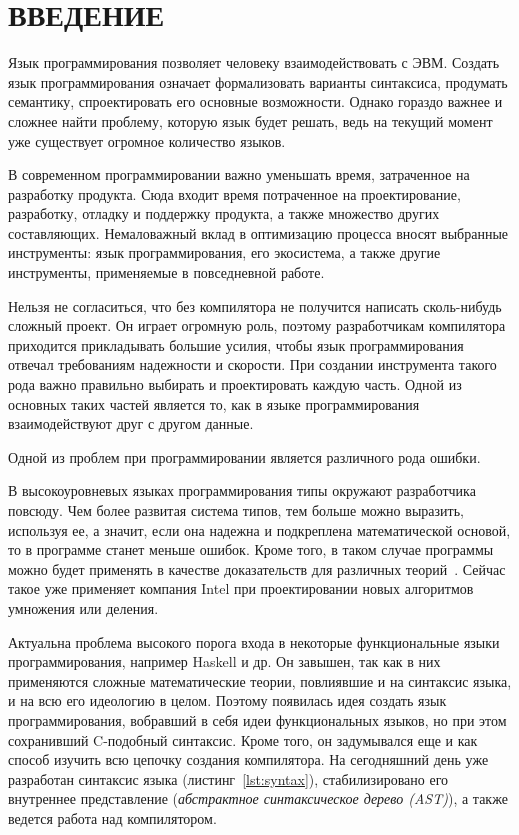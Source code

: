 \chapter*{ВВЕДЕНИЕ}\label{ch:introduction}


Язык программирования позволяет человеку взаимодействовать с ЭВМ.
Создать язык программирования означает формализовать варианты синтаксиса, продумать семантику, спроектировать его основные возможности.
Однако гораздо важнее и сложнее найти проблему, которую язык будет решать, ведь на текущий момент уже существует огромное количество языков.

В современном программировании важно уменьшать время, затраченное на разработку продукта.
Сюда входит время потраченное на проектирование, разработку, отладку и поддержку продукта, а также множество других составляющих.
Немаловажный вклад в оптимизацию процесса вносят выбранные инструменты: язык программирования, его экосистема, а также другие инструменты, применяемые в повседневной работе.

Нельзя не согласиться, что без компилятора не получится написать сколь-нибудь сложный проект.
Он играет огромную роль, поэтому разработчикам компилятора приходится прикладывать большие усилия, чтобы язык программирования отвечал требованиям надежности и скорости.
При создании инструмента такого рода важно правильно выбирать и проектировать каждую часть.
Одной из основных таких частей является то, как в языке программирования взаимодействуют друг с другом данные.

Одной из проблем при программировании является различного рода ошибки.

В высокоуровневых языках программирования типы окружают разработчика повсюду.
Чем более развитая система типов, тем больше можно выразить, используя ее, а значит, если она надежна и подкреплена математической основой, то в программе станет меньше ошибок.
Кроме того, в таком случае программы можно будет применять в качестве доказательств для различных теорий~\cite{AutoProvement}.
Сейчас такое уже применяет компания Intel при проектировании новых алгоритмов умножения или деления.

Актуальна проблема высокого порога входа в некоторые функциональные языки программирования, например Haskell и др.
Он завышен, так как в них применяются сложные математические теории, повлиявшие и на синтаксис языка, и на всю его идеологию в целом.
Поэтому появилась идея создать язык программирования, вобравший в себя идеи функциональных языков, но при этом сохранивший C-подобный синтаксис.
Кроме того, он задумывался еще и как способ изучить всю цепочку создания компилятора.
На сегодняшний день уже разработан синтаксис языка (листинг~\ref{lst:syntax}), стабилизировано его внутреннее представление (\textit{абстрактное синтаксическое дерево (AST)}), а также ведется работа над компилятором.

